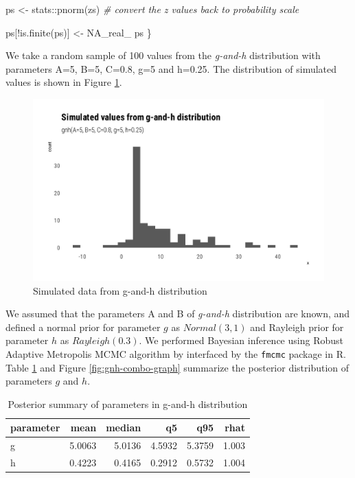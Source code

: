 \documentclass[
  12pt,
]{article}
\newenvironment{Shaded}{\begin{snugshade}}{\end{snugshade}}
\newcommand{\CommentTok}[1]{\textcolor[rgb]{0.56,0.35,0.01}{\textit{#1}}}
\newcommand{\ConstantTok}[1]{\textcolor[rgb]{0.00,0.00,0.00}{#1}}
\newcommand{\FunctionTok}[1]{\textcolor[rgb]{0.00,0.00,0.00}{#1}}
\newcommand{\NormalTok}[1]{#1}
\newcommand{\OtherTok}[1]{\textcolor[rgb]{0.56,0.35,0.01}{#1}}
\newcommand{\SpecialCharTok}[1]{\textcolor[rgb]{0.00,0.00,0.00}{#1}}
\begin{document}
\begin{Shaded}
\begin{Highlighting}[]
\NormalTok{  ps }\OtherTok{\textless{}{-}}\NormalTok{ stats}\SpecialCharTok{::}\FunctionTok{pnorm}\NormalTok{(zs) }\CommentTok{\# convert the z values back to probability scale}

\NormalTok{  ps[}\SpecialCharTok{!}\FunctionTok{is.finite}\NormalTok{(ps)] }\OtherTok{\textless{}{-}} \ConstantTok{NA\_real\_}
\NormalTok{  ps}
\NormalTok{\}}
\end{Highlighting}
\end{Shaded}

We take a random sample of 100 values from the \emph{g-and-h} distribution with parameters A=5, B=5, C=0.8, g=5 and h=0.25. The distribution of simulated values is shown in Figure \ref{fig:gnh-data}.

\begin{figure}

{\centering \includegraphics[width=0.8\linewidth]{ilbm_article_files/figure-latex/gnh-data-1} 

}

\caption{Simulated data from g-and-h distribution}\label{fig:gnh-data}
\end{figure}

We assumed that the parameters A and B of \emph{g-and-h} distribution are known, and defined a normal prior for parameter \(g\) as \(Normal(3,1)\) and Rayleigh prior for parameter \(h\) as \(Rayleigh(0.3)\). We performed Bayesian inference using Robust Adaptive Metropolis MCMC algorithm by \citet{vihola2012RobustAdaptiveMetropolis} interfaced by the \texttt{fmcmc} package \citep{vegayon2019FmcmcFriendlyMCMC} in R. Table \ref{tab:gnh-fit-tbl} and Figure \ref{fig:gnh-combo-graph} summarize the posterior distribution of parameters \(g\) and \(h\).

\begin{table}[!h]

\caption{\label{tab:gnh-fit-tbl}Posterior summary of parameters in g-and-h distribution}
\centering
\begin{tabular}[t]{lrrrrr}
\toprule
parameter & mean & median & q5 & q95 & rhat\\
\midrule
g & 5.0063 & 5.0136 & 4.5932 & 5.3759 & 1.003\\
h & 0.4223 & 0.4165 & 0.2912 & 0.5732 & 1.004\\
\bottomrule
\end{tabular}
\end{table}
\end{document}
